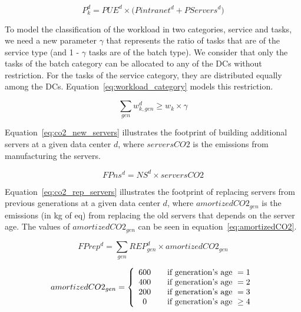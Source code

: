 \begin{equation} \label{eq:power_cons_gen}
   P^d_k  = PUE^d \times \big(  Pintranet^d + PServers^d\big)
\end{equation}


To model the classification of the workload in two categories, service and tasks, we need a new parameter $\gamma$ that represents the ratio of tasks that are of the service type (and 1 - $\gamma$ tasks are of the batch type). We consider that only the tasks of the batch category can be allocated to any of the DCs without restriction. For the tasks of the service category, they are distributed equally among the DCs. Equation~\eqref{eq:workload_category} models this restriction.

\begin{equation} \label{eq:workload_category}
 \sum_{gen}  w_{k,gen}^d \geq  w_k \times \gamma
\end{equation}




Equation~\eqref{eq:co2_new_servers} illustrates the footprint of building additional servers at a given data center $d$, where $serversCO2$ is the emissions from manufacturing the servers.

\begin{equation} \label{eq:co2_new_servers}
FPns^d = NS^d \times serversCO2
\end{equation}



Equation~\eqref{eq:co2_rep_servers} illustrates the footprint of replacing servers from previous generations at a given data center $d$, where $amortizedCO2_{gen}$ is the emissions (in kg of  eq) from replacing the old servers that depends on the server age. The values of $amortizedCO2_{gen}$ can be seen in equation~\eqref{eq:amortizedCO2}. 

\begin{equation} \label{eq:co2_rep_servers}
FPrep^d = \sum_{gen} REP_{gen}^d  \times amortizedCO2_{gen}
\end{equation}


\begin{equation} \label{eq:amortizedCO2}
amortizedCO2_{gen} =  \left\{ 
  \begin{array}{ c l }
    600   & \quad \textrm{if generation's age  } = 1     \\
    400   & \quad \textrm{if generation's age  } = 2     \\
    200   & \quad \textrm{if generation's age  }  = 3    \\
    0     & \quad \textrm{if generation's age } \geq 4   \\
  \end{array}
\right.
\end{equation}



